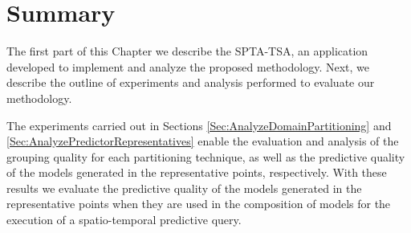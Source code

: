 
%
%
%
%
%
%
%
%
%

\section{Summary} 

The first part of this Chapter we describe the SPTA-TSA, an application developed to implement and analyze the proposed methodology. Next, we describe the outline of experiments and analysis performed to evaluate our methodology. 

The experiments carried out in Sections \ref{Sec:AnalyzeDomainPartitioning} and \ref{Sec:AnalyzePredictorRepresentatives} enable the evaluation and analysis of the grouping quality for each partitioning technique, as well as the predictive quality of the models generated in the representative points, respectively. With these results we evaluate the predictive quality of the models generated in the representative points when they are used in the composition of models for the execution of a spatio-temporal predictive query. 

